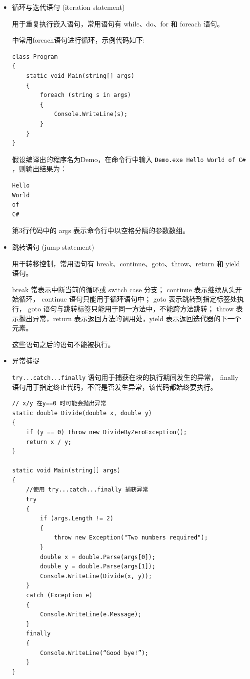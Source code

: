 \begin{itemize}
    \item 循环与迭代语句 (iteration statement)

          用于重复执行嵌入语句，常用语句有 while、do、for 和 foreach 语句。

          \cs 中常用foreach语句进行循环，示例代码如下:

          \begin{lstlisting}
class Program
{
    static void Main(string[] args)
    {
        foreach (string s in args)
        {
            Console.WriteLine(s);
        }
    }
}
\end{lstlisting}

          假设编译出的程序名为Demo，在命令行中输入 \verb|Demo.exe Hello World of C#| ，则输出结果为：
          \begin{verbatim}
Hello
World
of
C#
\end{verbatim}

          第3行代码中的 args 表示命令行中以空格分隔的参数数组。

    \item 跳转语句 (jump statement)

          用于转移控制，常用语句有 break、continue、goto、throw、return 和 yield 语句。

          break 常表示中断当前的循环或 switch case 分支；
          continue 表示继续从头开始循环， continue 语句只能用于循环语句中；
          goto 表示跳转到指定标签处执行， goto 语句与跳转标签只能用于同一方法中，不能跨方法跳转；
          throw 表示抛出异常，return 表示返回方法的调用处，yield 表示返回迭代器的下一个元素。

          这些语句之后的语句不能被执行。

    \item 异常捕捉

          \verb|try...catch...finally| 语句用于捕获在块的执行期间发生的异常，
          finally 语句用于指定终止代码，不管是否发生异常，该代码都始终要执行。

          \begin{lstlisting}
// x/y 在y==0 时可能会抛出异常
static double Divide(double x, double y)
{
    if (y == 0) throw new DivideByZeroException();
    return x / y;
}

static void Main(string[] args)
{
    //使用 try...catch...finally 捕获异常  
    try
    {
        if (args.Length != 2)
        {
            throw new Exception("Two numbers required");
        }
        double x = double.Parse(args[0]);
        double y = double.Parse(args[1]);
        Console.WriteLine(Divide(x, y));
    }
    catch (Exception e)
    {
        Console.WriteLine(e.Message);
    }
    finally
    {
        Console.WriteLine(“Good bye!”);
    }
}
\end{lstlisting}


\end{itemize}
